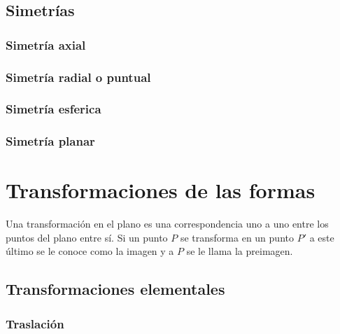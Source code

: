 \documentclass[16pt,]{krantz}
\theoremstyle{definition}
\theoremstyle{definition}
\theoremstyle{definition}
\theoremstyle{definition}
\theoremstyle{remark}
\begin{document}
\hypertarget{simetruxedas}{%
\section{Simetrías}\label{simetruxedas}}

\hypertarget{simetruxeda-axial}{%
\subsection{Simetría axial}\label{simetruxeda-axial}}

\hypertarget{simetruxeda-radial-o-puntual}{%
\subsection{Simetría radial o puntual}\label{simetruxeda-radial-o-puntual}}

\hypertarget{simetruxeda-esferica}{%
\subsection{Simetría esferica}\label{simetruxeda-esferica}}

\hypertarget{simetruxeda-planar}{%
\subsection{Simetría planar}\label{simetruxeda-planar}}

\hypertarget{transformaciones-de-las-formas}{%
\chapter{Transformaciones de las formas}\label{transformaciones-de-las-formas}}

Una transformación en el plano es una correspondencia uno a uno entre los puntos del plano entre sí. Si un punto \(P\) se transforma en un punto \(P'\) a este último se le conoce como la imagen y a \(P\) se le llama la preimagen.

\hypertarget{transformaciones-elementales}{%
\section{Transformaciones elementales}\label{transformaciones-elementales}}

\hypertarget{traslaciuxf3n}{%
\subsection{Traslación}\label{traslaciuxf3n}}
\end{document}
